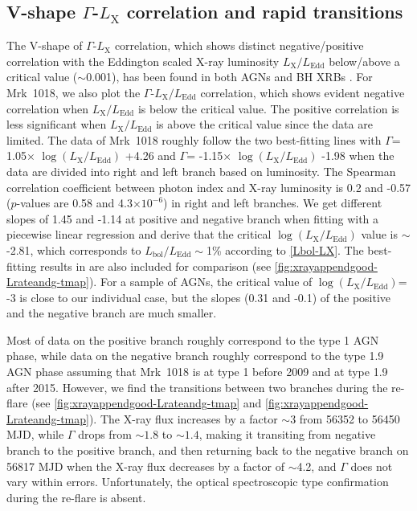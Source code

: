 \documentclass[twocolumn]{aastex63}
\begin{document}
\subsection{V-shape $\Gamma$-$L_\mathrm{X}$ correlation and rapid transitions}
The V-shape of $\Gamma$-$L_\mathrm{X}$ correlation, which shows distinct negative/positive correlation with the Eddington scaled X-ray luminosity $L_\mathrm{X}/L_\mathrm{Edd}$ below/above a critical value ($\sim$0.001), has been found in both AGNs and BH XRBs \citep[e.g.][]{2008ApJ...682..212W,2011A&A...530A.149Y,2015MNRAS.447.1692Y}. For Mrk~1018, we also plot the $\Gamma$-$L_\mathrm{X}/L_\mathrm{Edd}$ correlation, which shows evident negative correlation when $L_\mathrm{X}/L_\mathrm{Edd}$ is below the critical value. The positive correlation is less significant when $L_\mathrm{X}/L_\mathrm{Edd}$ is above the critical value since the data are limited. The data of Mrk~1018 roughly follow the two best-fitting lines with $\Gamma$= 1.05$\times$ $\log(L_\mathrm{X}/L_\mathrm{Edd})$ +4.26 and $\Gamma$= -1.15$\times$ $ \log(L_\mathrm{X}/L_\mathrm{Edd})$ -1.98 when the data are divided into right and left branch based on luminosity. The Spearman correlation coefficient between photon index and X-ray luminosity is 0.2 and -0.57 ($p$-values are 0.58 and 4.3$\times10^{-6}$) in right and left branches. We get different slopes of 1.45 and -1.14 at positive and negative branch when fitting with a piecewise linear regression and derive that the critical $\log(L_\mathrm{X}/L_\mathrm{Edd})$ value is $\sim$ -2.81, which corresponds to $L_\mathrm{bol}/L_\mathrm{Edd}\sim$1\% according to \autoref{Lbol-LX}. The best-fitting results in \citet{2015MNRAS.447.1692Y} are also included for comparison (see \autoref{fig:xrayappendgood-Lrateandg-tmap}). For a sample of AGNs, the critical value of $\log(L_\mathrm{X}/L_\mathrm{Edd})$= -3 is close to our individual case, but the slopes (0.31 and -0.1) of the positive and the negative branch are much smaller. 

Most of data on the positive branch roughly correspond to the type 1 AGN phase, while data on the negative branch roughly correspond to the type 1.9 AGN phase assuming that Mrk~1018 is at type 1 before 2009 and at type 1.9 after 2015. However, we find the transitions between two branches during the re-flare (see \autoref{fig:xrayappendgood-Lrateandg-tmap} and \autoref{fig:xrayappendgood-Lrateandg-tmap}). The X-ray flux increases by a factor $\sim3$ from 56352 to 56450 MJD, while $\Gamma$ drops from $\sim1.8$ to $\sim1.4$, making it transiting from negative branch to the positive branch, and then returning back to the negative branch on 56817 MJD when the X-ray flux decreases by a factor of $\sim$4.2, and $\Gamma$ does not vary within errors. Unfortunately, the optical spectroscopic type confirmation during the re-flare is absent.
\end{document}
